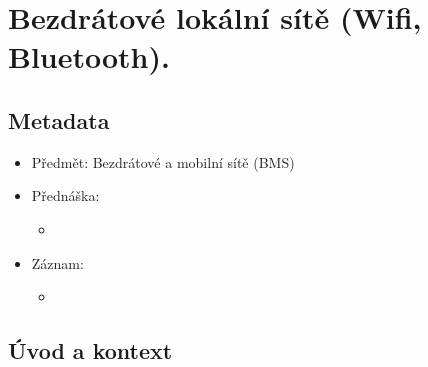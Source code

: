 

\chapter{Bezdrátové lokální sítě (Wifi, Bluetooth).}


\section{Metadata}

\begin{itemize}
    \item Předmět: Bezdrátové a mobilní sítě (BMS)
    \item Přednáška:
    \begin{itemize}
        \item {}
    \end{itemize}
    \item Záznam:
    \begin{itemize}
        \item {}
    \end{itemize}
\end{itemize}


\section{Úvod a kontext}

